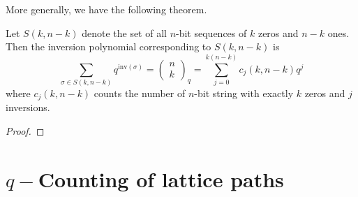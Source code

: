 More generally, we have the following theorem.
\begin{theorem}
Let $S(k,n-k)$ denote the set of all $n$-bit sequences of $k$ zeros and $n-k$ ones. Then the inversion polynomial corresponding to $S(k,n-k)$ is \[\sum_{\sigma\in S(k,n-k)} q^{\text{inv}(\sigma)}=\left(\begin{array}{c}n \\ k \end{array}\right)_q = \sum_{j=0}^{k(n-k)}c_j(k,n-k)q^j\] where $c_j(k,n-k)$ counts the number of $n$-bit string with exactly $k$ zeros and $j$ inversions.
\end{theorem}
\begin{proof}
\end{proof}
\section{\texorpdfstring{$q-$}-Counting of lattice paths}
\endinput
